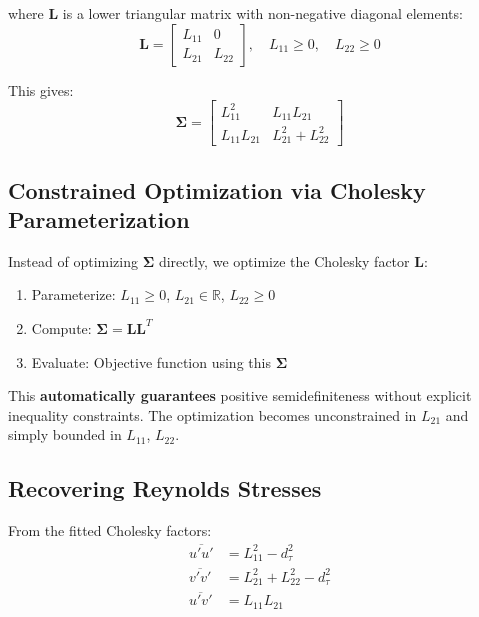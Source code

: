 \documentclass[11pt,a4paper]{article}
\begin{document}
where $\mathbf{L}$ is a lower triangular matrix with non-negative diagonal elements:
\begin{equation}
    \mathbf{L} = \begin{bmatrix} L_{11} & 0 \\ L_{21} & L_{22} \end{bmatrix}, \quad L_{11} \geq 0, \quad L_{22} \geq 0
\end{equation}

This gives:
\begin{equation}
    \boldsymbol{\Sigma} = \begin{bmatrix} L_{11}^2 & L_{11} L_{21} \\ L_{11} L_{21} & L_{21}^2 + L_{22}^2 \end{bmatrix}
\end{equation}

\subsection{Constrained Optimization via Cholesky Parameterization}

Instead of optimizing $\boldsymbol{\Sigma}$ directly, we optimize the Cholesky factor $\mathbf{L}$:

\begin{enumerate}
    \item Parameterize: $L_{11} \geq 0$, $L_{21} \in \mathbb{R}$, $L_{22} \geq 0$
    \item Compute: $\boldsymbol{\Sigma} = \mathbf{L} \mathbf{L}^T$
    \item Evaluate: Objective function using this $\boldsymbol{\Sigma}$
\end{enumerate}

This \textbf{automatically guarantees} positive semidefiniteness without explicit inequality constraints. The optimization becomes unconstrained in $L_{21}$ and simply bounded in $L_{11}$, $L_{22}$.

\subsection{Recovering Reynolds Stresses}

From the fitted Cholesky factors:
\begin{align}
    \overline{u'u'} &= L_{11}^2 - d_\tau^2 \\
    \overline{v'v'} &= L_{21}^2 + L_{22}^2 - d_\tau^2 \\
    \overline{u'v'} &= L_{11} L_{21}
\end{align}
\end{document}
